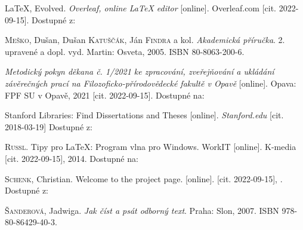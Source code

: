 \begin{thebibliography}{99}
\LaTeX, Evolved. \emph{Overleaf, online \LaTeX{} editor} [online]. Overleaf.com [cit. 2022-09-15]. Dostupné z: 


\textsc{Meško}, Dušan, Dušan \textsc{Katuščák}, Ján \textsc{Findra} a kol. \emph{Akademická příručka}. 2. upravené a dopl. vyd. Martin: Osveta, 2005. ISBN 80-8063-200-6.

\emph{Metodický pokyn děkana č. 1/2021 ke zpracování, zveřejňování a ukládání závěrečných prací na Filozoficko-přírodovědecké fakultě v Opavě} [online]. Opava: FPF SU v Opavě, 2021 [cit. 2022-09-15]. Dostupné na: 

Stanford Libraries: Find Dissertations and Theses [online]. \emph{Stanford.edu} [cit. 2018-03-19] Dostupné z: 


\textsc{Russl}. Tipy pro LaTeX: Program vlna pro Windows. WorkIT [online]. K-media [cit. 2022-09-15], 2014. Dostupné na:

\textsc{Schenk}, Christian. Welcome to the \MikTeX{} project page. \MikTeX{} [online]. [cit. 2022-09-15], . Dostupné z: 

\textsc{Šanderová}, Jadwiga. \emph{Jak číst a psát odborný text}. Praha: Slon, 2007. ISBN 978-80-86429-40-3.



\end{thebibliography}



